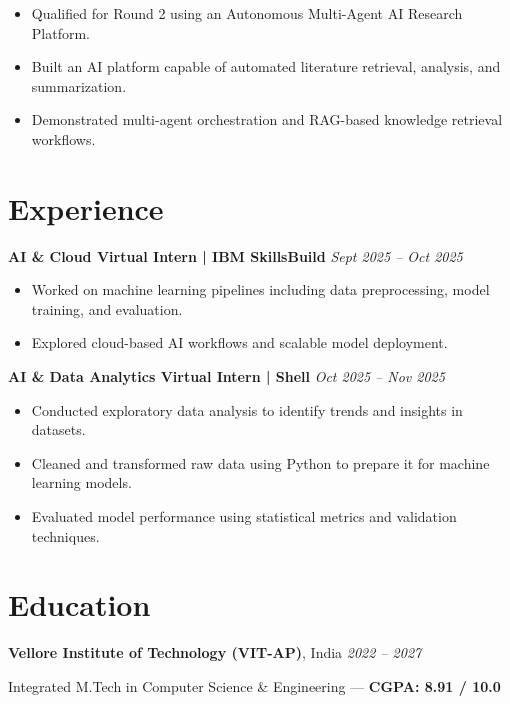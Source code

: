 \documentclass[10pt]{article}
\begin{document}
\begin{itemize}[leftmargin=*, itemsep=2pt]
\item Qualified for Round 2 using an Autonomous Multi-Agent AI Research Platform.
\item Built an AI platform capable of automated literature retrieval, analysis, and summarization.
\item Demonstrated multi-agent orchestration and RAG-based knowledge retrieval workflows.
\end{itemize}

\section*{Experience}

\textbf{AI \& Cloud Virtual Intern | IBM SkillsBuild} \hfill \textit{Sept 2025 -- Oct 2025}

\begin{itemize}[leftmargin=*, itemsep=2pt]
\item Worked on machine learning pipelines including data preprocessing, model training, and evaluation.
\item Explored cloud-based AI workflows and scalable model deployment.
\end{itemize}

\textbf{AI \& Data Analytics Virtual Intern | Shell} \hfill \textit{Oct 2025 -- Nov 2025}

\begin{itemize}[leftmargin=*, itemsep=2pt]
\item Conducted exploratory data analysis to identify trends and insights in datasets.
\item Cleaned and transformed raw data using Python to prepare it for machine learning models.
\item Evaluated model performance using statistical metrics and validation techniques.
\end{itemize}

\section*{Education}

\textbf{Vellore Institute of Technology (VIT-AP)}, India \hfill \textit{2022 -- 2027}

Integrated M.Tech in Computer Science \& Engineering — \textbf{CGPA: 8.91 / 10.0}
\end{document}
